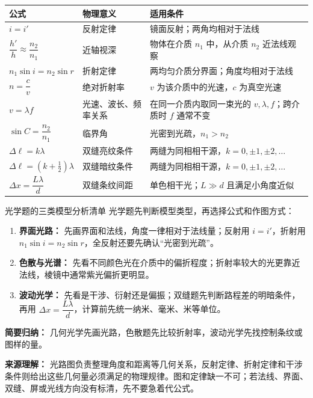 \begin{center}
\begingroup
\renewcommand{\arraystretch}{1.18}
\begin{tabular}{p{}p{}p{}}
\toprule
公式 & 物理意义 & 适用条件 \\
\midrule
$i=i'$ & 反射定律 & 镜面反射；两角均相对于法线 \\
$\dfrac{h'}{h}\approx\dfrac{n_2}{n_1}$ & 近轴视深 & 物体在介质 $n_1$ 中，从介质 $n_2$ 近法线观察 \\
$n_1\sin i=n_2\sin r$ & 折射定律 & 两均匀介质分界面；角度均相对于法线 \\
$n=\dfrac{c}{v}$ & 绝对折射率 & $v$ 为该介质中的光速，$c$ 为真空光速 \\
$v=\lambda f$ & 光速、波长、频率关系 & 在同一介质内取同一束光的 $v,\lambda,f$；跨介质时 $f$ 通常不变 \\
$\sin C=\dfrac{n_2}{n_1}$ & 临界角 & 光密到光疏，$n_1>n_2$ \\
$\Delta \ell=k\lambda$ & 双缝亮纹条件 & 两缝为同相相干源，$k=0,\pm1,\pm2,\ldots$ \\
$\Delta \ell=(k+\frac12)\lambda$ & 双缝暗纹条件 & 两缝为同相相干源，$k=0,\pm1,\pm2,\ldots$ \\
$\Delta x=\dfrac{L\lambda}{d}$ & 双缝条纹间距 & 单色相干光；$L\gg d$ 且满足小角度近似 \\
\bottomrule
\end{tabular}
\endgroup
\end{center}

\begin{learningbox}{光学题的三类模型分析清单}
光学题先判断模型类型，再选择公式和作图方式：
\begin{enumerate}
  \item \textbf{界面光路：} 先画界面和法线，角度一律相对于法线量；反射用 $i=i'$，折射用 $n_1\sin i=n_2\sin r$，全反射还要先确认“光密到光疏”。
  \item \textbf{色散与光谱：} 先看不同颜色光在介质中的偏折程度；折射率较大的光更靠近法线，棱镜中通常紫光偏折更明显。
  \item \textbf{波动光学：} 先看是干涉、衍射还是偏振；双缝题先判断路程差的明暗条件，再用 $\Delta x=\dfrac{L\lambda}{d}$，计算前先统一纳米、毫米、米等单位。
\end{enumerate}
\textbf{简要归纳：} 几何光学先画光路，色散题先比较折射率，波动光学先找控制条纹或图样的量。

\textbf{来源理解：} 光路图负责整理角度和距离等几何关系，反射定律、折射定律和干涉条件则给出这些几何量必须满足的物理规律。图和定律缺一不可；若法线、界面、双缝、屏或光线方向没有标清，先不要急着代公式。
\end{learningbox}

